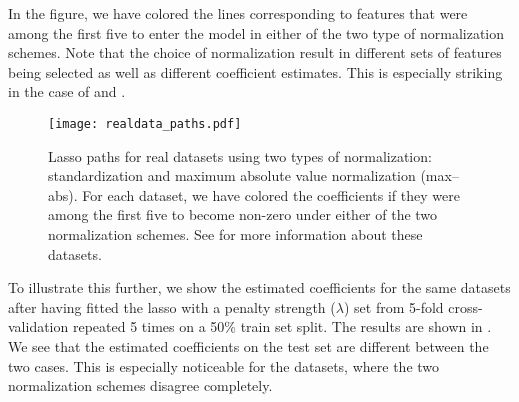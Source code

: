 In the figure, we have colored the lines corresponding to features that were among the
first five to enter the model in either of the two type of normalization schemes. Note that
the choice of normalization result in different sets of features being selected as well as
different coefficient estimates. This is especially striking in the case of
 and .

\begin{figure}[bpt]
  \centering
  \texttt{[image: realdata\_paths.pdf]}
  \caption{%
    Lasso paths for real datasets using two types of normalization:
    standardization and maximum absolute value normalization (max--abs). For
    each dataset, we have colored the coefficients if they were among the first
    five to become non-zero under either of the two normalization schemes. See
     for more information about these datasets.
  }
  \label{fig:realdata-paths}
\end{figure}

To illustrate this further, we show the estimated coefficients for the same datasets after
having fitted the lasso with a penalty strength (\(\lambda\)) set from 5-fold
cross-validation repeated 5 times on a 50\% train set split. The results are shown in
. We see that the estimated coefficients on the test set are
different between the two cases. This is especially noticeable for the 
datasets, where the two normalization schemes disagree completely.

